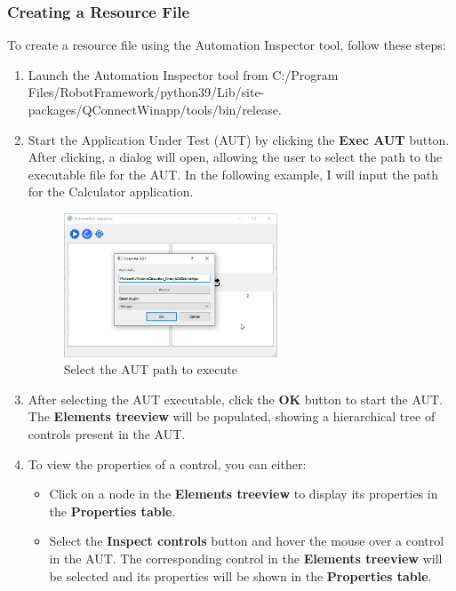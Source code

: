 \subsubsection{Creating a Resource File}
To create a resource file using the Automation Inspector tool, follow these steps:

\begin{enumerate}
    \item Launch the Automation Inspector tool from C:/Program Files/RobotFramework/python39/Lib/site-packages/QConnectWinapp/tools/bin/release.
    \item Start the Application Under Test (AUT) by clicking the \textbf{Exec AUT} button. After clicking, a dialog will open, allowing the user to select the path to the executable file for the AUT. 
	In the following example, I will input the path for the Calculator application.
	
    \begin{figure}[ht]
        \centering
        \includegraphics[width=0.6\textwidth]{pictures/step2.png}
        \caption{Select the AUT path to execute}
        \label{fig:select_aut}
    \end{figure}
	
    \item After selecting the AUT executable, click the \textbf{OK} button to start the AUT. The \textbf{Elements treeview} will be populated, showing a hierarchical tree of controls present in the AUT.
    \item To view the properties of a control, you can either:
        \begin{itemize}
            \item Click on a node in the \textbf{Elements treeview} to display its properties in the \textbf{Properties table}.
            \item Select the \textbf{Inspect controls} button and hover the mouse over a control in the AUT. The corresponding control in the \textbf{Elements treeview} will be selected and its properties will be shown in the \textbf{Properties table}.
        \end{itemize}
		

\end{enumerate}
